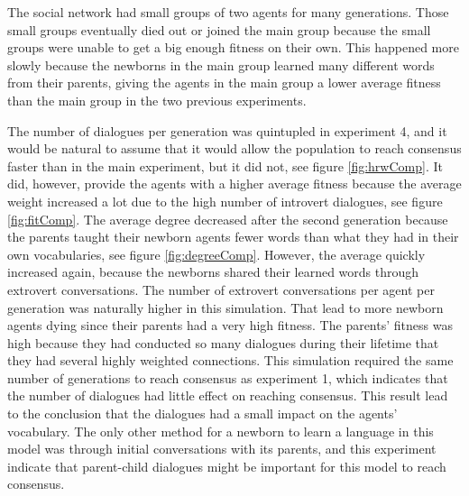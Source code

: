 The social network had small groups of two agents for many generations. Those small groups eventually died out or joined the main group because the small groups were unable to get a big enough fitness on their own. This happened more slowly because the newborns in the main group learned many different words from their parents, giving the agents in the main group a lower average fitness than the main group in the two previous experiments.

The number of dialogues per generation was quintupled in experiment 4, and it would be natural to assume that it would allow the population to reach consensus faster than in the main experiment, but it did not, see figure \ref{fig:hrwComp}. It did, however, provide the agents with a higher average fitness because the average weight increased a lot due to the high number of introvert dialogues, see figure \ref{fig:fitComp}. The average degree decreased after the second generation because the parents taught their newborn agents fewer words than what they had in their own vocabularies, see figure \ref{fig:degreeComp}. However, the average quickly increased again, because the newborns shared their learned words through extrovert conversations. The number of extrovert conversations per agent per generation was naturally higher in this simulation. That lead to more newborn agents dying since their parents had a very high fitness. The parents' fitness was high because they had conducted so many dialogues during their lifetime that they had several highly weighted connections. This simulation required the same number of generations to reach consensus as experiment 1, which indicates that the number of dialogues had little effect on reaching consensus. This result lead to the conclusion that the dialogues had a small impact on the agents' vocabulary. The only other method for a newborn to learn a language in this model was through initial conversations with its parents, and this experiment indicate that parent-child dialogues might be important for this model to reach consensus.  

